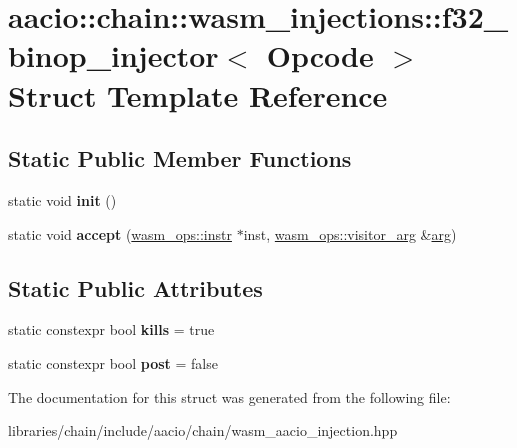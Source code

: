 \hypertarget{structaacio_1_1chain_1_1wasm__injections_1_1f32__binop__injector}{}\section{aacio\+:\+:chain\+:\+:wasm\+\_\+injections\+:\+:f32\+\_\+binop\+\_\+injector$<$ Opcode $>$ Struct Template Reference}
\label{structaacio_1_1chain_1_1wasm__injections_1_1f32__binop__injector}
\subsection*{Static Public Member Functions}
\begin{DoxyCompactItemize}
\item 
\mbox{\label{structaacio_1_1chain_1_1wasm__injections_1_1f32__binop__injector_a3d755d26d81e442ead8cc022dbd93475}} 
static void {\bfseries init} ()
\item 
\mbox{\label{structaacio_1_1chain_1_1wasm__injections_1_1f32__binop__injector_a748d4c2068301b3427025e660b498fe0}} 
static void {\bfseries accept} (\mbox{\hyperlink{structaacio_1_1chain_1_1wasm__ops_1_1instr}{wasm\+\_\+ops\+::instr}} $\ast$inst, \mbox{\hyperlink{structaacio_1_1chain_1_1wasm__ops_1_1visitor__arg}{wasm\+\_\+ops\+::visitor\+\_\+arg}} \&\mbox{\hyperlink{unionarg}{arg}})
\end{DoxyCompactItemize}
\subsection*{Static Public Attributes}
\begin{DoxyCompactItemize}
\item 
\mbox{\label{structaacio_1_1chain_1_1wasm__injections_1_1f32__binop__injector_afe877be52b3115ab4990b7086cb3f672}} 
static constexpr bool {\bfseries kills} = true
\item 
\mbox{\label{structaacio_1_1chain_1_1wasm__injections_1_1f32__binop__injector_afeda194723d3d103af034ffef5e9c96f}} 
static constexpr bool {\bfseries post} = false
\end{DoxyCompactItemize}


The documentation for this struct was generated from the following file\+:\begin{DoxyCompactItemize}
\item 
libraries/chain/include/aacio/chain/wasm\+\_\+aacio\+\_\+injection.\+hpp\end{DoxyCompactItemize}
